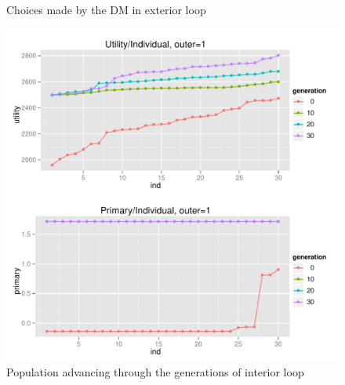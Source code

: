 \begin{figure}
{    \label{c2_dmchoices_03}
  }
  \caption{Choices made by the DM in exterior loop}
\end{figure}


\begin{figure}
  \centering \includegraphics[width=1.0\textwidth]{exp/nouncert/c2_utilind_01}
  \caption{Population advancing through the generations of interior loop}
  \label{c2_utilind_01}
\end{figure}

